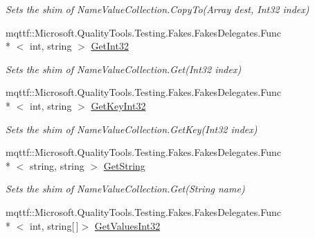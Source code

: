 \begin{DoxyCompactItemize}
\begin{DoxyCompactList}\small\item\em Sets the shim of Name\-Value\-Collection.\-Copy\-To(\-Array dest, Int32 index)\end{DoxyCompactList}\item 
mqttf\-::\-Microsoft.\-Quality\-Tools.\-Testing.\-Fakes.\-Fakes\-Delegates.\-Func\\*
$<$ int, string $>$ \hyperlink{class_system_1_1_collections_1_1_specialized_1_1_fakes_1_1_shim_name_value_collection_af46bbfe15bb17b79d770b18da3ac1a26}{Get\-Int32}
\begin{DoxyCompactList}\small\item\em Sets the shim of Name\-Value\-Collection.\-Get(\-Int32 index)\end{DoxyCompactList}\item 
mqttf\-::\-Microsoft.\-Quality\-Tools.\-Testing.\-Fakes.\-Fakes\-Delegates.\-Func\\*
$<$ int, string $>$ \hyperlink{class_system_1_1_collections_1_1_specialized_1_1_fakes_1_1_shim_name_value_collection_a7e207f2a9734fc7d0f16668e6f392bb3}{Get\-Key\-Int32}
\begin{DoxyCompactList}\small\item\em Sets the shim of Name\-Value\-Collection.\-Get\-Key(\-Int32 index)\end{DoxyCompactList}\item 
mqttf\-::\-Microsoft.\-Quality\-Tools.\-Testing.\-Fakes.\-Fakes\-Delegates.\-Func\\*
$<$ string, string $>$ \hyperlink{class_system_1_1_collections_1_1_specialized_1_1_fakes_1_1_shim_name_value_collection_ae2075f400a4b3ba2b9dd44c255678832}{Get\-String}
\begin{DoxyCompactList}\small\item\em Sets the shim of Name\-Value\-Collection.\-Get(\-String name)\end{DoxyCompactList}\item 
mqttf\-::\-Microsoft.\-Quality\-Tools.\-Testing.\-Fakes.\-Fakes\-Delegates.\-Func\\*
$<$ int, string\mbox{[}$\,$\mbox{]}$>$ \hyperlink{class_system_1_1_collections_1_1_specialized_1_1_fakes_1_1_shim_name_value_collection_a25f6efc1a9316b6819812c50b7a98a01}{Get\-Values\-Int32}

\end{DoxyCompactItemize}
